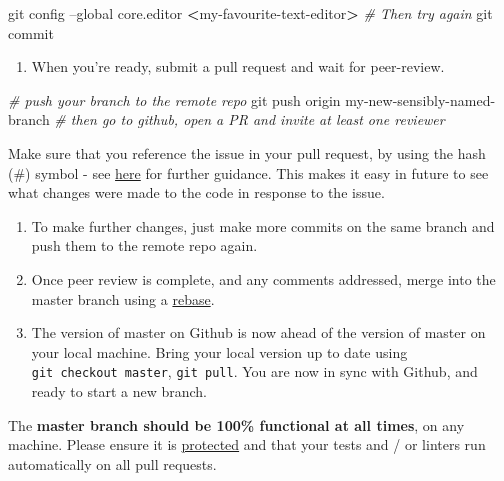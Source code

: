 \documentclass[]{book}
\newenvironment{Shaded}{\begin{snugshade}}{\end{snugshade}}
\newcommand{\CommentTok}[1]{\textcolor[rgb]{0.56,0.35,0.01}{\textit{#1}}}
\newcommand{\FunctionTok}[1]{\textcolor[rgb]{0.00,0.00,0.00}{#1}}
\newcommand{\NormalTok}[1]{#1}
\newcommand{\OperatorTok}[1]{\textcolor[rgb]{0.81,0.36,0.00}{\textbf{#1}}}
\providecommand{\tightlist}{%
  \setlength{\itemsep}{0pt}\setlength{\parskip}{0pt}}
\begin{document}
\begin{Shaded}
\begin{Highlighting}[]
\FunctionTok{git}\NormalTok{ config --global core.editor }\OperatorTok{<}\NormalTok{my-favourite-text-editor}\OperatorTok{>}
 \CommentTok{# Then try again}
\FunctionTok{git}\NormalTok{ commit}
\end{Highlighting}
\end{Shaded}

\begin{enumerate}
\def\labelenumi{\arabic{enumi}.}
\setcounter{enumi}{4}
\tightlist
\item
  When you're ready, submit a pull request and wait for peer-review.
\end{enumerate}

\begin{Shaded}
\begin{Highlighting}[]
\CommentTok{# push your branch to the remote repo}
\FunctionTok{git}\NormalTok{ push origin my-new-sensibly-named-branch}
\CommentTok{# then go to github, open a PR and invite at least one reviewer}
\end{Highlighting}
\end{Shaded}

Make sure that you reference the issue in your pull request, by using the hash (\#) symbol - see \href{https://help.github.com/articles/autolinked-references-and-urls/}{here} for further guidance. This makes it easy in future to see what changes were made to the code in response to the issue.

\begin{enumerate}
\def\labelenumi{\arabic{enumi}.}
\setcounter{enumi}{5}
\item
  To make further changes, just make more commits on the same branch and push them to the remote repo again.
\item
  Once peer review is complete, and any comments addressed, merge into the master branch using a \href{https://github.com/blog/2243-rebase-and-merge-pull-requests}{rebase}.
\item
  The version of master on Github is now ahead of the version of master on your local machine. Bring your local version up to date using \texttt{git\ checkout\ master}, \texttt{git\ pull}. You are now in sync with Github, and ready to start a new branch.
\end{enumerate}

The \textbf{master branch should be 100\% functional at all times}, on any machine. Please ensure it is \href{https://help.github.com/articles/about-protected-branches/}{protected} and that your tests and / or linters run automatically on all pull requests.
\end{document}
